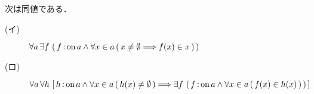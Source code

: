 	\begin{screen}
		\begin{thm}[選択公理と直積]
			次は同値である．
			\begin{description}
				\item[(イ)] $\forall a\, \exists f\, \left(\, f \operatorname*{:on} a \wedge \forall x \in a\, (\, x \neq \emptyset \Longrightarrow f(x) \in x\, )\, \right)$
				\item[(ロ)] $\forall a\, \forall h\, \left[\, h \operatorname*{:on} a \wedge \forall x \in a\, (\, h(x) \neq \emptyset\, )
				\Longrightarrow \exists f\, \left(\, f \operatorname*{:on} a \wedge \forall x \in a\, (\, f(x) \in h(x)\, )\, \right)\, \right]$
			\end{description}
		\end{thm}
	\end{screen}
	
